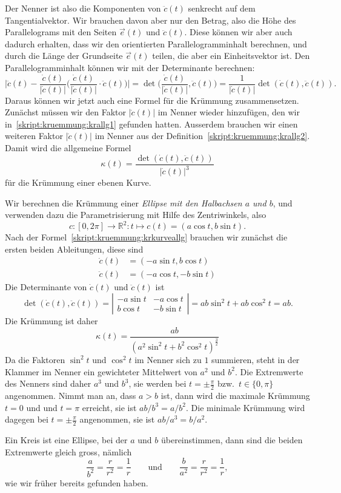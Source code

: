 Der Nenner ist also die Komponenten von $\ddot c(t)$ senkrecht auf dem
Tangentialvektor.
Wir brauchen davon aber nur den Betrag, also die Höhe des Parallelograms
mit den Seiten $\vec e(t)$ und $\ddot c(t)$.
Diese können wir aber auch dadurch erhalten, dass wir den orientierten
Parallelogramminhalt berechnen, und durch die Länge der Grundseite
$\vec e(t)$ teilen, die aber ein Einheitsvektor ist.
Den Parallelogramminhalt können wir mit der Determinante berechnen:
\[
\biggl|\ddot c(t) - \frac{\dot c(t)}{|\dot c(t)|}
\biggl(\frac{\dot c(t)}{|\dot c(t)|} \cdot \ddot c(t)\biggr)\biggr|
=
\det \biggl(\frac{\dot c(t)}{|\dot c(t)|}, \ddot c(t)\biggr)
=
\frac1{|\dot c(t)|}\det (\dot c(t),\ddot c(t)).
\]
Daraus können wir jetzt auch eine Formel für die Krümmung zusammensetzen.
Zunächst müssen wir den Faktor $|\dot c(t)|$ im Nenner wieder
hinzufügen, den wir in~\eqref{skript:kruemmung:krallg1} gefunden hatten.
Ausserdem brauchen wir einen weiteren Faktor $|\dot c(t)|$ im Nenner
aus der Definition~\eqref{skript:kruemmung:krallg2}.
Damit wird die allgemeine Formel
\begin{equation}
\kappa(t)
=
\frac{\det(\dot c(t),\ddot c(t))}{|\dot c(t)|^3}
\label{skript:kruemmung:krkurveallg}
\end{equation}
für die Krümmung einer ebenen Kurve.


\begin{beispiel}
Wir berechnen die Krümmung einer {\em Ellipse mit den Halbachsen
$a$ und $b$}, und verwenden dazu die Parametrisierung mit Hilfe des
Zentriwinkels, also
\[
c
\colon
[0,2\pi]\to\mathbb R^2
\colon
t\mapsto c(t) = (a\cos t, b \sin t).
\]
Nach der Formel~\eqref{skript:kruemmung:krkurveallg} brauchen wir zunächst
die ersten beiden Ableitungen, diese sind
\begin{align*}
\dot c(t)
&=
(-a\sin t, b\cos t)
\\
\ddot c(t)
&=
(-a\cos t, -b\sin t)
\end{align*}
Die Determinante von $\dot c(t)$ und $\ddot c(t)$ ist
\[
\det(\dot c(t), \ddot c(t))
=
\left|\begin{matrix}
-a\sin t & -a \cos t\\
 b\cos t & -b \sin t
\end{matrix}\right|
=
ab\sin^2t+ab\cos^2 t
=
ab.
\]
Die Krümmung ist daher
\[
\kappa(t)
=
\frac{ab}{(a^2\sin^2 t + b^2 \cos^2 t)^{\frac32}}
\]
Da die Faktoren $\sin^2t$ und $\cos^2t$ im Nenner sich zu $1$ summieren,
steht in der Klammer im Nenner ein gewichteter Mittelwert von $a^2$
und $b^2$.
Die Extremwerte des Nenners sind daher $a^3$ und $b^3$, sie werden bei
$t=\pm\frac{\pi}2$ bzw.~$t\in\{0,\pi\}$ angenommen.
Nimmt man an, dass $a>b$ ist, dann wird die maximale Krümmung $t=0$ und
und $t=\pi$ erreicht, sie ist $ab/b^3=a/b^2$.
Die minimale Krümmung wird dagegen bei $t=\pm\frac{\pi}2$ angenommen,
sie ist $ab/a^3=b/a^2$.

Ein Kreis ist eine Ellipse, bei der $a$ und $b$ übereinstimmen, dann sind
die beiden Extremwerte gleich gross, nämlich
\[
\frac{a}{b^2}=\frac{r}{r^2}=\frac1r
\qquad\text{und}\qquad
\frac{b}{a^2}=\frac{r}{r^2}=\frac1r,
\]
wie wir früher bereits gefunden haben.
\end{beispiel}

